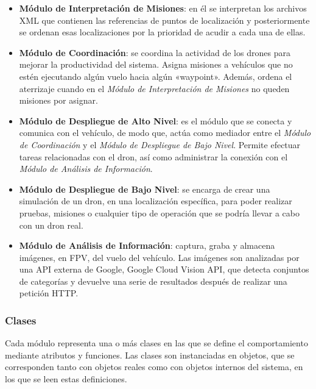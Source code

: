 \begin{itemize}
\item \textbf{Módulo de Interpretación de Misiones}: en él se interpretan los archivos XML que contienen las referencias de puntos de localización y posteriormente se ordenan esas localizaciones por la prioridad de acudir a cada una de ellas.
\item \textbf{Módulo de Coordinación}: se coordina la actividad de los drones para mejorar la productividad del sistema. Asigna misiones a vehículos que no estén ejecutando algún vuelo hacia algún «waypoint». Además, ordena el aterrizaje cuando en el \textit{Módulo de Interpretación de Misiones} no queden misiones por asignar.
\item \textbf{Módulo de Despliegue de Alto Nivel}: es el módulo que se conecta y comunica con el vehículo, de modo que, actúa como mediador entre el \textit{Módulo de Coordinación} y el \textit{Módulo de Despliegue de Bajo Nivel}. Permite efectuar tareas relacionadas con el dron, así como administrar la conexión con el \textit{Módulo de Análisis de Información}.
\item \textbf{Módulo de Despliegue de Bajo Nivel}: se encarga de crear una simulación de un dron, en una localización específica, para poder realizar pruebas, misiones o cualquier tipo de operación que se podría llevar a cabo con un dron real.
\item \textbf{Módulo de Análisis de Información}: captura, graba y almacena imágenes, en \acs{FPV}, del vuelo del vehículo. Las imágenes son analizadas por una \acs{API} externa de Google, Google Cloud Vision \acs{API}, que detecta conjuntos de categorías y devuelve una serie de resultados después de realizar una petición \acs{HTTP}. 
\end{itemize} 

\subsubsection{Clases}
\label{sec:clases}

Cada módulo representa una o más clases en las que se define el comportamiento mediante atributos y funciones. Las clases son instanciadas en objetos, que se corresponden tanto con objetos reales como con objetos internos del sistema, en los que se leen estas definiciones.

